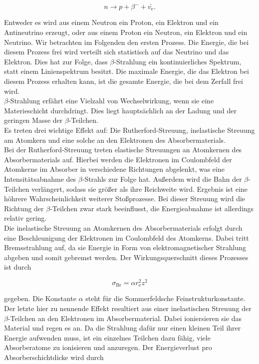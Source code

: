 \begin{equation*}
n \rightarrow p + \beta^{-} + \bar{v_\text{e}}.
\end{equation*}

Entweder es wird aus einem Neutron ein Proton, ein Elektron und ein Antineutrino
erzeugt, oder aus einem Proton ein Neutron, ein Elektron und ein Neutrino. Wir betrachten
im Folgenden den ersten Prozess. Die Energie, die bei diesem Prozess frei wird verteilt
sich statistisch auf das Neutrino und das Elektron. Dies hat zur Folge, dass 
$\beta$-Strahlung ein kontinuierliches Spektrum, statt einem Linienspektrum besitzt.
Die maximale Energie, die das Elektron bei diesem Prozess erhalten kann, ist die
gesamte Energie, die bei dem Zerfall frei wird. \\
$\beta$-Strahlung erfährt eine Vielzahl von Wechselwirkung, wenn sie eine 
Materieschicht durchdringt. Dies liegt hauptsächlich an der Ladung und der 
geringen Masse der $\beta$-Teilchen.\\
Es treten drei wichtige Effekt auf: Die Rutherford-Streuung, inelastische 
Streuung am Atomkern und eine solche an den Elektronen des Absorbermaterials.\\
Bei der Rutherford-Streuung treten elastische Streuungen an Atomkernen des 
Absorbermaterials auf. Hierbei werden die Elektronen im Coulombfeld der Atomkerne
im Absorber in verschiedene Richtungen abgelenkt, was eine Intensitätsabnahme des
$\beta$-Strahls zur Folge hat. Außerdem wird die Bahn der $\beta$-Teilchen 
verlängert, sodass sie größer als ihre Reichweite wird. Ergebnis ist eine höhrere
Wahrscheinlichkeit weiterer Stoßprozesse. Bei dieser Streuung wird die Richtung
der $\beta$-Teilchen zwar stark beeinflusst, die Energieabnahme ist allerdings 
relativ gering. \\
Die inelastische Streuung an Atomkernen des Absorbermaterials erfolgt durch eine 
Beschleunigung der Elektronen im Coulombfeld des Atomkerns. Dabei tritt 
Bremsstrahlung auf, da sie Energie in Form von elektromagnetischer 
Strahlung abgeben und somit gebremst werden. Der Wirkungsquerschnitt
dieses Prozesses ist durch 

\begin{equation*}
\sigma_\text{Br} = \alpha r_\text{e}^2 z^2
\end{equation*}

gegeben. Die Konstante $\alpha$ steht für die Sommerfeldsche Feinstrukturkonstante.\\

Der letzte hier zu nennende Effekt resultiert aus einer inelastischen Streuung 
der $\beta$-Teilchen an den Elektronen im Absorbermaterial. Dabei ioniersieren 
sie das Material und regen es an. Da die Strahlung dafür nur einen kleinen Teil 
ihrer Energie aufwenden muss, ist ein einzelnes Teilchen dazu fähig, viele 
Absorberatome zu ionisieren und anzuregen. Der Energieverlust pro Absorberschichtdicke
wird durch 

